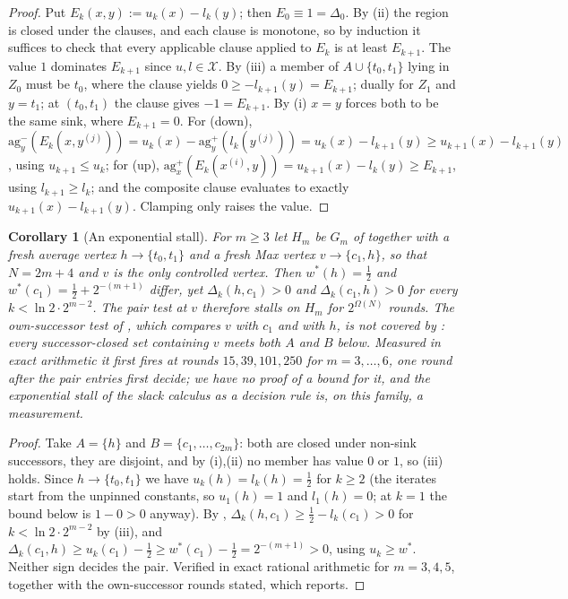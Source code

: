 \documentclass[11pt]{article}
\theoremstyle{plain}
\newtheorem{corollary}[theorem]{Corollary}
\theoremstyle{definition}
\begin{document}
\begin{proof}
Put $E_k(x,y):=u_k(x)-l_k(y)$; then $E_0\equiv1=\Delta_0$. By (ii) the
region is closed under the clauses, and each clause is monotone, so by
induction it suffices to check that every applicable clause applied to
$E_k$ is at least $E_{k+1}$. The value $1$ dominates $E_{k+1}$ since
$u,l\in\mathcal{X}$. By (iii) a member of $A\cup\{t_0,t_1\}$ lying in
$Z_0$ must be $t_0$, where the clause yields $0\ge-l_{k+1}(y)=E_{k+1}$;
dually for $Z_1$ and $y=t_1$; at $(t_0,t_1)$ the clause gives $-1=E_{k+1}$.
By (i) $x=y$ forces both to be the same sink, where $E_{k+1}=0$. For
(down),
$\mathrm{ag}^{-}_{y}(E_k(x,y^{(j)}))=u_k(x)-\mathrm{ag}^{+}_{y}(l_k(y^{(j)}))
=u_k(x)-l_{k+1}(y)\ge u_{k+1}(x)-l_{k+1}(y)$, using $u_{k+1}\le u_k$; for
(up), $\mathrm{ag}^{+}_{x}(E_k(x^{(i)},y))=u_{k+1}(x)-l_k(y)\ge E_{k+1}$,
using $l_{k+1}\ge l_k$; and the composite clause evaluates to exactly
$u_{k+1}(x)-l_{k+1}(y)$. Clamping only raises the value.
\end{proof}

\begin{corollary}[An exponential stall]\label{cor:slack-stalls}
For $m\ge3$ let $H_m$ be $G_m$ of  together with a
fresh average vertex $h\to\{t_0,t_1\}$ and a fresh Max vertex
$v\to\{c_1,h\}$, so that $N=2m+4$ and $v$ is the only controlled vertex.
Then $w^\ast(h)=\tfrac12$ and $w^\ast(c_1)=\tfrac12+2^{-(m+1)}$ differ,
yet $\Delta_k(h,c_1)>0$ and $\Delta_k(c_1,h)>0$ for every
$k<\ln2\cdot2^{m-2}$. The pair test at $v$ therefore stalls on $H_m$ for
$2^{\Omega(N)}$ rounds. The own-successor test of
, which compares $v$ with $c_1$ and with $h$, is
\emph{not} covered by : every successor-closed
set containing $v$ meets both $A$ and $B$ below. Measured in exact
arithmetic it first fires at rounds $15,39,101,250$ for $m=3,\dots,6$,
one round after the pair entries first decide; we have no proof of a
bound for it, and the exponential stall of the slack calculus as a
\emph{decision rule} is, on this family, a measurement.
\end{corollary}

\begin{proof}
Take $A=\{h\}$ and $B=\{c_1,\dots,c_{2m}\}$: both are closed under
non-sink successors, they are disjoint, and by (i),(ii)
no member has value $0$ or $1$, so (iii) holds. Since $h\to\{t_0,t_1\}$
we have $u_k(h)=l_k(h)=\tfrac12$ for $k\ge2$ (the iterates start from the
unpinned constants, so $u_1(h)=1$ and $l_1(h)=0$; at $k=1$ the bound below
is $1-0>0$ anyway). By
, $\Delta_k(h,c_1)\ge\tfrac12-l_k(c_1)>0$ for
$k<\ln2\cdot2^{m-2}$ by (iii), and
$\Delta_k(c_1,h)\ge u_k(c_1)-\tfrac12\ge w^\ast(c_1)-\tfrac12=2^{-(m+1)}>0$,
using $u_k\ge w^\ast$. Neither sign decides the pair. Verified in exact
rational arithmetic for $m=3,4,5$, together with the own-successor rounds
stated, which  reports.
\end{proof}
\end{document}
